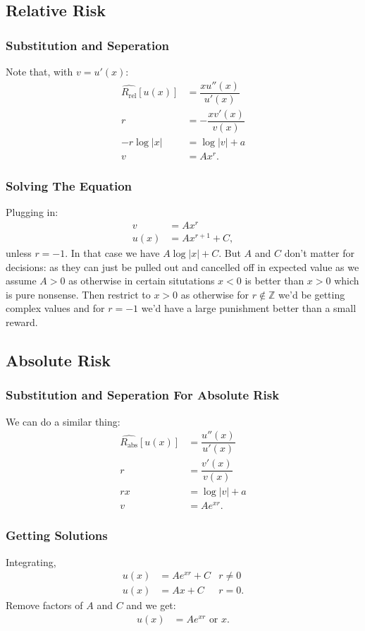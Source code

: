 \documentclass{beamer}
\begin{document}
    \subsection{Relative Risk}
        \begin{frame}
            \frametitle{Substitution and Seperation}
                Note that, with $v=u'(x)$:
                \begin{align*}
                    \hat{R_{\text{rel}}}[u(x)] &= \dfrac{xu''(x)}{u'(x)} \\ 
                    r &= -\dfrac{xv'(x)}{v(x)} \\ 
                    -r\log |x| &= \log|v| + a \\ 
                    v &= Ax^r.
                \end{align*}
        \end{frame}
        \begin{frame}
            \frametitle{Solving The Equation}
            Plugging in:
                \begin{align*}
                    v &= Ax^r \\ 
                    u(x) &= Ax^{r+1} + C,
                \end{align*}
                unless $r=-1$. \pause In that case we have $A\log |x| + C$. But $A$ and $C$ don't matter for decisions: as they can just be pulled out and cancelled off in expected value as we assume $A > 0$
                as otherwise in certain situtations $x<0$ is better than $x>0$ which is pure nonsense. \pause Then restrict to $x>0$ as otherwise for $r \not \in \mathbb{Z}$ we'd be getting complex values and for $r=-1$ we'd have 
                a large punishment better than a small reward.
        \end{frame}
    \subsection{Absolute Risk}
        \begin{frame}\frametitle{Substitution and Seperation For Absolute Risk}
            We can do a similar thing:
            \begin{align*}
                \hat{R_{\text{abs}}}[u(x)] &= \dfrac{u''(x)}{u'(x)} \\ 
                r &= \dfrac{v'(x)}{v(x)} \\ 
                rx &= \log|v| + a \\ 
                v &= Ae^{xr}.
            \end{align*}
        \end{frame}
        \begin{frame}\frametitle{Getting Solutions}
            Integrating,
            \begin{align*}
                u(x) &= Ae^{xr} + C& r\ne 0 \\ 
                u(x) &= Ax + C& r=0.
            \end{align*}
            \pause Remove factors of $A$ and $C$ and we get:
            \begin{align*}
                u(x) &= Ae^{xr} \text{ or } x.
            \end{align*}
        \end{frame}
    
\end{document}
